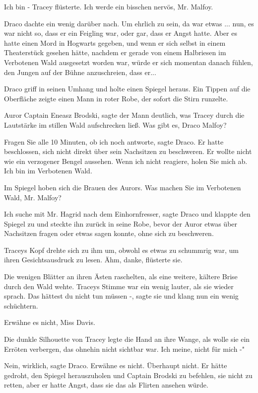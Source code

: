 \glqq Ich bin -\grqq{} Tracey flüsterte. \glqq Ich werde ein bisschen nervös,
Mr. Malfoy.\grqq{}

Draco dachte ein wenig darüber nach. Um ehrlich zu sein, da war etwas ... nun,
es war nicht so, dass er ein Feigling war, oder gar, dass er Angst hatte.
Aber es hatte einen Mord in Hogwarts gegeben, und wenn er sich selbst in
einem Theaterstück gesehen hätte, nachdem er gerade von einem Halbriesen
im Verbotenen Wald ausgesetzt worden war, würde er sich momentan danach
fühlen, den Jungen auf der Bühne anzuschreien, dass er...

Draco griff in seinen Umhang und holte einen Spiegel heraus. Ein Tippen auf die
Oberfläche zeigte einen Mann in roter Robe, der sofort die Stirn
runzelte.

\glqq Auror Captain Eneasz Brodski\grqq{}, sagte der Mann deutlich, was Tracey
durch die Lautstärke im stillen Wald aufschrecken ließ. \glqq Was gibt
es, Draco Malfoy?\grqq{}

\glqq Fragen Sie alle 10 Minuten, ob ich noch antworte\grqq{}, sagte Draco. Er
hatte beschlossen, sich nicht direkt über sein Nachsitzen zu beschweren.
Er wollte nicht wie ein verzogener Bengel aussehen. \glqq Wenn ich nicht
reagiere, holen Sie mich ab. Ich bin im Verbotenen Wald.\grqq{}

Im Spiegel hoben sich die Brauen des Aurors. \glqq Was machen Sie im Verbotenen
Wald, Mr. Malfoy?\grqq{}

\glqq Ich suche mit Mr. Hagrid nach dem Einhornfresser\grqq{}, sagte Draco und
klappte den Spiegel zu und steckte ihn zurück in seine Robe, bevor der
Auror etwas über Nachsitzen fragen oder etwas sagen konnte, ohne sich zu
beschweren.

Traceys Kopf drehte sich zu ihm um, obwohl es etwas zu schummrig war, um ihren
Gesichtsausdruck zu lesen. \glqq Ähm, danke\grqq{}, flüsterte sie.

Die wenigen Blätter an ihren Ästen raschelten, als eine weitere, kältere Brise
durch den Wald wehte. Traceys Stimme war ein wenig lauter, als sie wieder
sprach. \glqq Das hättest du nicht tun müssen -\grqq{}, sagte sie und
klang nun ein wenig schüchtern.

\glqq Erwähne es nicht, Miss Davis.\grqq{}

Die dunkle Silhouette von Tracey legte die Hand an ihre Wange, als wolle sie ein
Erröten verbergen, das ohnehin nicht sichtbar war. \glqq Ich meine, nicht
für mich -"

\glqq Nein, wirklich\grqq{}, sagte Draco. \glqq Erwähne es nicht. Überhaupt
nicht.\grqq{} Er hätte gedroht, den Spiegel herauszuholen und Captain Brodski zu
befehlen, sie nicht zu retten, aber er hatte Angst, dass sie das als Flirten
ansehen würde.

